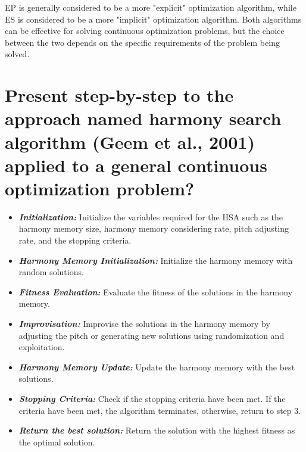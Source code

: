 \documentclass[conference]{IEEEtran}
\begin{document}
EP is generally considered to be a more "explicit" optimization algorithm, while ES is considered to be a more "implicit" optimization algorithm. Both algorithms can be effective for solving continuous optimization problems, but the choice between the two depends on the specific requirements of the problem being solved.

\section{Present step-by-step to the approach named harmony search algorithm (Geem et al., 2001) applied to a general continuous optimization problem?}

\begin{itemize}
	\item \textbf{\textit{Initialization:}} Initialize the variables required for the HSA such as the harmony memory size, harmony memory considering rate, pitch adjusting rate, and the stopping criteria.
	
	\item \textbf{\textit{Harmony Memory Initialization:}} Initialize the harmony memory with random solutions.
	
	\item \textbf{\textit{Fitness Evaluation:}} Evaluate the fitness of the solutions in the harmony memory.
	
	\item \textbf{\textit{Improvisation:}} Improvise the solutions in the harmony memory by adjusting the pitch or generating new solutions using randomization and exploitation.
	
	\item \textbf{\textit{Harmony Memory Update:}} Update the harmony memory with the best solutions.
	
	\item \textbf{\textit{Stopping Criteria:}} Check if the stopping criteria have been met. If the criteria have been met, the algorithm terminates, otherwise, return to step 3.
	
	\item \textbf{\textit{Return the best solution:}} Return the solution with the highest fitness as the optimal solution.
	
\end{itemize}
\end{document}

